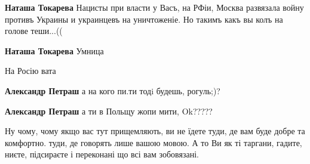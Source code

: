 \begin{itemize}
\begin{itemize}

\textbf{Наташа Токарева} Нацисты при власти у Васъ, на РФіи, Москва развязала войну противъ Украины и украинцевъ на уничтоженіе. Но такимъ какъ вы колъ на голове теши...((


\textbf{Наташа Токарева} Умница
\end{itemize}


На Росію вата

\begin{itemize}

\textbf{Александр Петраш} а на кого пи.ти тодi будешь, рогуль;)?


\textbf{Александр Петраш} а ти в Польщу жопи мити, Ok?????
\end{itemize}



Ну чому, чому якщо вас тут прищемляють, ви не їдете туди, де вам буде добре та
комфортно. туди, де говорять лише вашою мовою. А то Ви як ті таргани, гадите,
ниєте, підсираєте і переконані що всі вам зобовязані.

\end{itemize}

